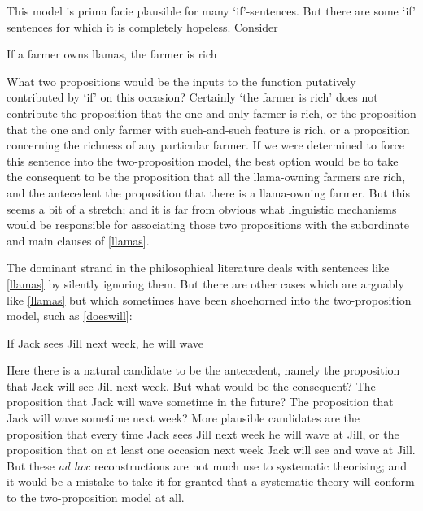 \documentclass[If.tex]{subfiles}
\begin{document}
This model is prima facie plausible for many ‘if’-sentences. But there are some ‘if’ sentences for which it is completely hopeless. Consider
\begin{prop}
	\nitem \label{llamas} 
	If a farmer owns llamas, the farmer is rich
\end{prop}
What two propositions would be the inputs to the function putatively contributed by ‘if’ on this occasion? Certainly ‘the farmer is rich’ does not contribute the proposition that the one and only farmer is rich, or the proposition that the one and only farmer with such-and-such feature is rich, or a proposition concerning the richness of any particular farmer. If we were determined to force this sentence into the two-proposition model, the best option would be to take the consequent to be the proposition that all the llama-owning farmers are rich, and the antecedent the proposition that there is a llama-owning farmer. But this seems a bit of a stretch; and it is far from obvious what linguistic mechanisms would be responsible for associating those two propositions with the subordinate and main clauses of \ref{llamas}.

The dominant strand in the philosophical literature deals with sentences like \ref{llamas} by silently ignoring them. But there are other cases which are arguably like \ref{llamas} but which sometimes have been shoehorned into the two-proposition model, such as \ref{doeswill}:
\begin{prop}
	\nitem \label{doeswill} 
	If Jack sees Jill next week, he will wave
\end{prop}
Here there is a natural candidate to be the antecedent, namely the proposition that Jack will see Jill next week. But what would be the consequent? The proposition that Jack will wave sometime in the future? The proposition that Jack will wave sometime next week? More plausible candidates are the proposition that every time Jack sees Jill next week he will wave at Jill, or the proposition that on at least one occasion next week Jack will see and wave at Jill. But these \emph{ad hoc} reconstructions are not much use to systematic theorising; and it would be a mistake to take it for granted that a systematic theory will conform to the two-proposition model at all.
\end{document}
